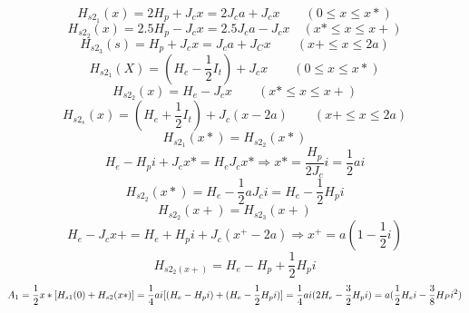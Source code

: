 \begin{equation}%
H_{s2_{1}}(x)=2H_{p}+J_{c}x=2J_{c}a+J_{c}x\qquad(0\leq x\leq x*)
\end{equation}
\begin{equation}%
H_{s2_{2}}(x)=2.5H_{p}-J_{c}x=2.5J_{c}a-J_{c}x\quad(x*\leq x\leq x+)
\end{equation}
\begin{equation}%
H_{s2_{3}}(s)=H_{p}+J_{c}x=J_{c}a+J_{C}x\qquad(x+\leq x\leq 2a)
\end{equation}
\begin{equation}%
H_{s2_{1}}(X)=(H_{e}-\frac{1}{2}I_{t})+J_{c}x\qquad(0\leq x\leq x*)
\end{equation}
\begin{equation}%
H_{s2_{2}}(x)=H_{e}-J_{c}x\qquad(x*\leq x\leq x+)
\end{equation}
\begin{equation}%
H_{s2_{s}}(x)=(H_{e}+\frac{1}{2}I_{t})+J_{c}(x-2a)\qquad(x+\leq x\leq2a)
\end{equation}
\begin{equation}%
H_{{s}2_{1}}(x*)=H_{s2_{2}}(x*)
\end{equation}
\begin{equation}%
H_{e}-H_{p}i+J_{c}x*=H_{e}J_{c}x*\Rightarrow x*=\frac{H_{p}}{2J_{c}}i=\frac{1}{2}ai
\end{equation}
\begin{equation}%
H_{s2_{2}}(x*)=H_{e}-\frac{1}{2}aJ_{c}i=H_{e}-\frac{1}{2}H_{p}i
\end{equation}
\begin{equation}%
H_{s2_{2}}(x+)=H_{s2_{3}}(x+)
\end{equation}
\begin{equation}%
H_{e}-J_{c}x+=H_{e}+H_{p}i+J_{c}(x^{+}-2a)\Rightarrow x^{+}=a(1-\frac{1}{2}i)
\end{equation}
\begin{equation}%
H_{s2_{2}(x+)}=H_{e}-H_{p}+\frac{1}{2}H_{p}i
\end{equation}
\begin{equation}%
A_{1}=\frac{1}{2}x*[H_{s1}(0)+H_{s2}(x*)]=\frac{1}{4}ai[(H_{e}-H_{p}i)+(H_{e}-\frac{1}{2}H_{p}i)]\\
=\frac{1}{4}ai(2H_{e}-\frac{3}{2}H_{p}i)  
=a(\frac{1}{2}H_{e}i-\frac{3}{8}H_{P}i^{2})
\end{equation}
